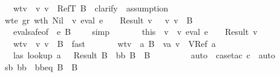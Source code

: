 \begin{isabellebody}
\ \ \ \ \ \ \ \ \ wtv{}{\isacharcolon}\ {\isachardoublequoteopen}{\isasymSigma}\ {\isasymturnstile}v\ v{}\ {\isacharcolon}\ RefT\ B{\isachardoublequoteclose}\ \isamarkupfalse \ clarify\ \isamarkupfalse \ assumption\ \isamarkupfalse \isanewline
\ \ \ \ \ \ \isamarkupfalse \ wte{}\ gr\ wt{\isacharunderscore}h\ Nil\ \isamarkupfalse \ {\isachardoublequoteopen}{\isacharparenleft}{\isasymexists}v{}{\isachardot}\ eval\ e{}\ {\isasymrho}\ {\isasymmu}\ {\isacharequal}\ Result\ v{}\ {\isasymand}\ {\isasymSigma}\ {\isasymturnstile}v\ v{}\ {\isacharcolon}\ B{\isacharparenright}{\isachardoublequoteclose}\isanewline
\ \ \ \ \ \ \ \ \isamarkupfalse \ eval{\isacharunderscore}safe{\isacharbrackleft}of\ {\isasymGamma}\ e{}\ {\isachardoublequoteopen}B{\isachardoublequoteclose}\ {\isasymSigma}\ {\isasymrho}\ {\isasymmu}{\isacharbrackright}\ \isamarkupfalse \ simp\isanewline
\ \ \ \ \ \ \isamarkupfalse \ this\ \isamarkupfalse \ v{}\ \ v{}{\isacharcolon}\ {\isachardoublequoteopen}eval\ e{}\ {\isasymrho}\ {\isasymmu}\ {\isacharequal}\ Result\ v{}{\isachardoublequoteclose}\isanewline
\ \ \ \ \ \ \ \ \ wtv{}{\isacharcolon}\ {\isachardoublequoteopen}{\isasymSigma}\ {\isasymturnstile}v\ v{}\ {\isacharcolon}\ B{\isachardoublequoteclose}\ \isamarkupfalse \ fast\isanewline
\ \ \ \ \ \ \isamarkupfalse \ wtv{}\ \isamarkupfalse \ a\ B{\isacharprime}\ \ v{}a{\isacharcolon}\ {\isachardoublequoteopen}v{}\ {\isacharequal}\ VRef\ a{\isachardoublequoteclose}\isanewline
\ \ \ \ \ \ \ \ \ las{\isacharcolon}\ {\isachardoublequoteopen}lookup\ a\ {\isasymSigma}\ {\isacharequal}\ Result\ B{\isacharprime}{\isachardoublequoteclose}\ \ bb{\isacharcolon}\ {\isachardoublequoteopen}B{\isacharprime}\ {\isasymsqsubseteq}\ B{\isachardoublequoteclose}\isanewline
\ \ \ \ \ \ \ \ \isamarkupfalse \ auto\ \isamarkupfalse \ {\isacharparenleft}case{\isacharunderscore}tac\ c{\isacharparenright}\ \isamarkupfalse \ auto\ \isamarkupfalse \isanewline
\ \ \ \ \ \ \isamarkupfalse \ sb\ bb\ \isamarkupfalse \ bbeq{\isacharcolon}\ {\isachardoublequoteopen}B\ {\isacharequal}\ B{\isacharprime}{\isachardoublequoteclose}\isanewline

\end{isabellebody}
